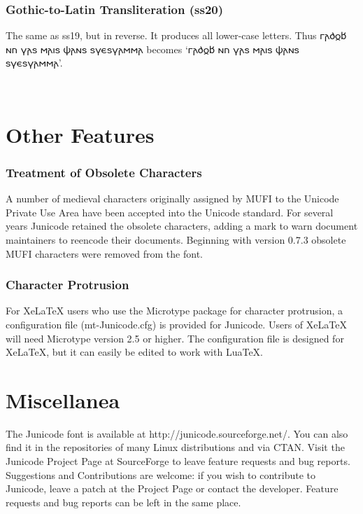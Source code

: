\documentclass[12pt,a4paper,openany]{book}
\begin{document}
\subsection*{Gothic-to-Latin Transliteration (ss20)}

The same as ss19, but in reverse. It produces all lower-case
letters. Thus 𐌲𐌰𐌳𐍉𐌱 𐌽𐌿 𐍅𐌰𐍃 𐌼𐌰𐌹𐍃 𐌸𐌰𐌽𐍃 𐍃𐍅𐌴𐍃𐍅𐌰𐌼𐌼𐌰
becomes ‘{𐌲𐌰𐌳𐍉𐌱 𐌽𐌿 𐍅𐌰𐍃 𐌼𐌰𐌹𐍃 𐌸𐌰𐌽𐍃 𐍃𐍅𐌴𐍃𐍅𐌰𐌼𐌼𐌰}’.

\begin{center}
\huge {\color{myRed}}
\end{center}

\chapter*{\color{myBlue}Other Features}

\subsection*{Treatment of Obsolete Characters}

A number of medieval characters originally assigned by MUFI to the
Unicode Private Use Area have been accepted into the Unicode
standard. For several years Junicode retained the obsolete
characters, adding a mark to warn document maintainers to reencode
their documents. Beginning with version 0.7.3 obsolete MUFI characters
were removed from the font.

\subsection*{Character Protrusion}

For XeLaTeX users who use the Microtype package for character
protrusion, a configuration file (mt-Junicode.cfg) is provided for
Junicode. Users of XeLaTeX will need Microtype version 2.5 or
higher. The configuration file is designed for XeLaTeX, but it can
easily be edited to work with LuaTeX.

\chapter*{\color{myBlue}Miscellanea}

\noindent The Junicode font is available at
http://junicode.sourceforge.net/. You can also find it in the
repositories of many Linux distributions and via CTAN. Visit the
Junicode Project Page at SourceForge to leave feature requests and bug
reports. Suggestions and Contributions are welcome: if you wish to
contribute to Junicode, leave a patch at the Project Page or contact
the developer.  Feature requests and bug reports can be left in the
same place.
\end{document}
